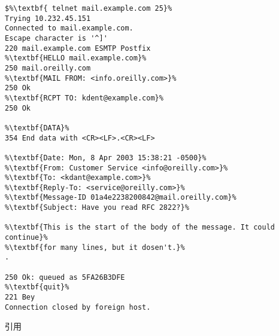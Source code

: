\begin{lstlisting}[escapechar=\%,frame={single},caption={\smtp コマンド入力},label={src:smtpコマンド入力}]
$%\textbf{ telnet mail.example.com 25}%
Trying 10.232.45.151
Connected to mail.example.com.
Escape character is '^]'
220 mail.example.com ESMTP Postfix
%\textbf{HELLO mail.example.com}%
250 mail.oreilly.com
%\textbf{MAIL FROM: <info.oreilly.com>}%
250 Ok
%\textbf{RCPT TO: kdent@example.com}%
250 Ok

%\textbf{DATA}%
354 End data with <CR><LF>.<CR><LF>

%\textbf{Date: Mon, 8 Apr 2003 15:38:21 -0500}%
%\textbf{From: Customer Service <info@oreilly.com>}%
%\textbf{To: <kdant@example.com>}%
%\textbf{Reply-To: <service@oreilly.com>}%
%\textbf{Message-ID 01a4e2238200842@mail.oreilly.com}%
%\textbf{Subject: Have you read RFC 2822?}%

%\textbf{This is the start of the body of the message. It could continue}%
%\textbf{for many lines, but it dosen't.}%
.

250 Ok: queued as 5FA26B3DFE
%\textbf{quit}%
221 Bey
Connection closed by foreign host.
    \end{lstlisting}
\hfill 引用\cite[p.18]{Postfix実用ガイド}